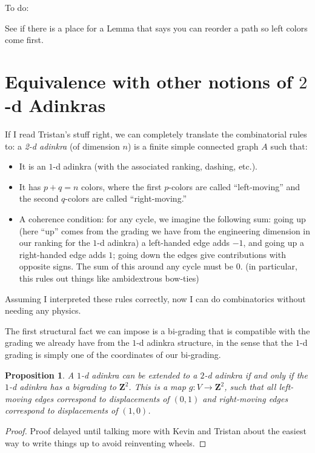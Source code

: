 \documentclass[12pt,twoside,singlespace]{article}
\numberwithin{equation}{section}
\newtheorem{prop}[equation]{Proposition}
\theoremstyle{definition}
\newcommand{\ZZ}{\mathbf{Z}}
\begin{document}
To do:

See if there is a place for a Lemma that says you can reorder a path so left colors come first.


\appendix
\section{Equivalence with other notions of $2$-d Adinkras}


If I read Tristan's stuff right, we can completely translate the combinatorial rules to: a \emph{2-d adinkra} (of dimension $n$) is a finite simple connected graph $A$ such that:
\begin{itemize}
\item It is an $1$-d adinkra (with the associated ranking, dashing, etc.).
\item It has $p + q = n$ colors, where the first $p$-colors are called ``left-moving'' and the second $q$-colors are called ``right-moving.''
\item A coherence condition: for any cycle, we imagine the following sum: going up (here ``up'' comes from the grading we have from the engineering dimension in our ranking for the $1$-d adinkra) a left-handed edge adds $-1$, and going up a right-handed edge adds $1$; going down the edges give contributions with opposite signs. The sum of this around any cycle must be $0$. (in particular, this rules out things like ambidextrous bow-ties)
\end{itemize} 

Assuming I interpreted these rules correctly, now I can do combinatorics without needing any physics.


The first structural fact we can impose is a bi-grading that is compatible with the grading we already have from the $1$-d adinkra structure, in the sense that the $1$-d grading is simply one of the coordinates of our bi-grading.

\begin{prop}
A $1$-d adinkra can be extended to a $2$-d adinkra if and only if the $1$-d adinkra has a \emph{bigrading} to $\ZZ^2$. This is a map $g: V \rightarrow \ZZ^2$, such that all left-moving edges correspond to displacements of $(0, 1)$ and right-moving edges correspond to displacements of $(1, 0)$.
\end{prop}

\begin{proof}
Proof delayed until talking more with Kevin and Tristan about the easiest way to write things up to avoid reinventing wheels.
\end{proof}
\end{document}
